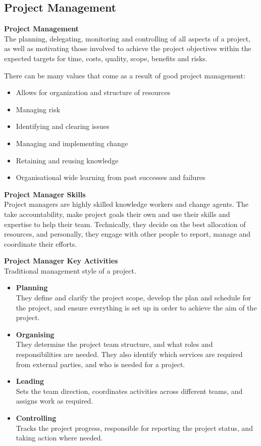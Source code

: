 \documentclass[a4paper,10pt]{article}
\begin{document}
\subsection*{Project Management}
\begin{shaded}
	\noindent \textcolor{Emerald}{\textbf{Project Management}} \\
	The planning, delegating, monitoring and controlling of all aspects of a project, as well as motivating those involved to achieve the project objectives within the expected targets for time, costs, quality, scope, benefits and risks. 
\end{shaded}
There can be many values that come as a result of good project management: 
\begin{itemize}
	\item Allows for organization and structure of resources 
	\item Managing risk 
	\item Identifying and clearing issues 
	\item Managing and implementing change 
	\item Retaining and reusing knowledge 
	\item Organisational wide learning from past successes and failures 
\end{itemize}
\begin{shaded}
\noindent \textcolor{Emerald}{\textbf{Project Manager Skills}} \\
Project managers are highly skilled knowledge workers and change agents. The take accountability, make project goals their own and use their skills and expertise to help their team. Technically, they decide on the best allocation of resources, and personally, they engage with other people to report, manage and coordinate their efforts. 
\end{shaded}
\newpage
\noindent \textcolor{BlueGreen}{\textbf{Project Manager Key Activities}} \\
Traditional management style of a project. 
\begin{itemize}
	\item \textbf{Planning} \\
	They define and clarify the project scope, develop the plan and schedule for the project, and ensure everything is set up in order to achieve the aim of the project. 
	\item \textbf{Organising} \\
	They determine the project team structure, and what roles and responsibilities are needed. They also identify which services are required from external parties, and who is needed for a project. 
	\item \textbf{Leading} \\
	Sets the team direction, coordinates activities across different teams, and assigns work as required. 
	\item \textbf{Controlling} \\
	Tracks the project progress, responsible for reporting the project status, and taking action where needed. 
\end{itemize}
\end{document}
